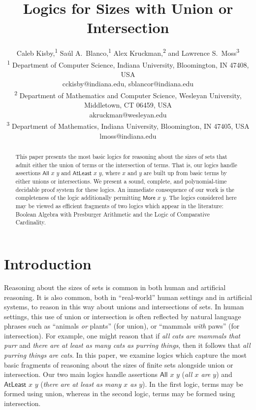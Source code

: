 \documentclass[letterpaper]{article} %
\title{Logics for Sizes with Union or Intersection}
\author{Caleb Kisby,\textsuperscript{\rm 1} 
Sa\'ul A.~Blanco,\textsuperscript{\rm 1} 
Alex Kruckman,\textsuperscript{\rm 2} and 
Lawrence S.~Moss\textsuperscript{\rm 3}\\ 
\textsuperscript{1}
Department of Computer Science, Indiana University, Bloomington, IN 47408, USA \\
cckisby@indiana.edu, sblancor@indiana.edu \\
\textsuperscript{2}
Department of Mathematics and Computer Science, Wesleyan University, Middletown, CT 06459,  USA\\
akruckman@wesleyan.edu \\
\textsuperscript{3}
Department of Mathematics, Indiana University, Bloomington, IN 47405, USA \\
lmoss@indiana.edu \\
}
\theoremstyle{definition}
\newcommand{\rem}[1]{\relax}
\newcommand{\All}[2]{\mathsf{All}\,\,#1\,\,#2}
\newcommand{\Atleast}[2]{\mathsf{AtLeast}\,\,#1\,\,#2}
\newcommand{\More}[2]{\mathsf{More}\,\,#1\,\,#2}
\begin{document}
\maketitle


\begin{abstract}
    This paper presents the most basic logics for reasoning about the sizes of sets that admit either the union of terms or the intersection of terms.  That is, our logics handle assertions $\All{x}{y}$ and $\Atleast{x}{y}$, where $x$ and $y$ are built up from basic terms by either unions or intersections.  We present a sound, complete, and polynomial-time decidable proof system for these logics. 
    An immediate consequence of our work is the completeness of the logic additionally permitting $\More{x}{y}$.  The logics considered here may be viewed as efficient fragments of two logics which appear in the literature:  Boolean Algebra with Presburger Arithmetic and the Logic of Comparative Cardinality.
\end{abstract}

\section{Introduction}

Reasoning about the sizes of sets is common in both human and artificial reasoning.  It is also common, both in ``real-world'' human settings and in artificial systems, to reason in this way about unions and intersections of sets. In human settings, this use of union or intersection is often reflected by natural language phrases such as ``animals \emph{or} plants'' (for union), or ``mammals \emph{with} paws'' (for intersection).  For example, one might reason that if \emph{all cats are mammals that purr} and \emph{there are at least as many cats as purring things}, then it follows that \emph{all purring things are cats}.
\rem{\hl{REVISED}
For example, one might reason that if \emph{there are at least as many birds as mammals} and \emph{all cats are mammals}, then it follows that \emph{there are at least as many birds as cats}.  
}
In this paper, we examine logics which capture the most basic fragments of reasoning about the sizes of finite sets alongside union or intersection.  Our two main logics handle assertions $\All{x}{y}$ (\emph{all $x$ are $y$}) and $\Atleast{x}{y}$ (\emph{there are at least as many $x$ as $y$}).  In the first logic, terms may be formed using union, whereas in the second logic, terms may be formed using intersection.
\end{document}
